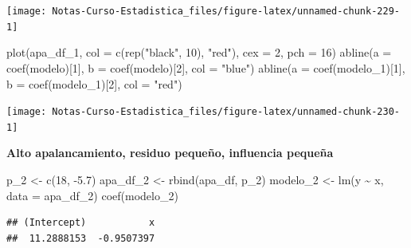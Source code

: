 \documentclass[
  12pt,
]{book}
\newenvironment{Shaded}{\begin{snugshade}}{\end{snugshade}}
\newcommand{\AttributeTok}[1]{\textcolor[rgb]{0.77,0.63,0.00}{#1}}
\newcommand{\DecValTok}[1]{\textcolor[rgb]{0.00,0.00,0.81}{#1}}
\newcommand{\FloatTok}[1]{\textcolor[rgb]{0.00,0.00,0.81}{#1}}
\newcommand{\FunctionTok}[1]{\textcolor[rgb]{0.00,0.00,0.00}{#1}}
\newcommand{\NormalTok}[1]{#1}
\newcommand{\OtherTok}[1]{\textcolor[rgb]{0.56,0.35,0.01}{#1}}
\newcommand{\SpecialCharTok}[1]{\textcolor[rgb]{0.00,0.00,0.00}{#1}}
\newcommand{\StringTok}[1]{\textcolor[rgb]{0.31,0.60,0.02}{#1}}
\theoremstyle{definition}
\theoremstyle{definition}
\theoremstyle{definition}
\theoremstyle{remark}
\begin{document}
\begin{center}\texttt{[image: Notas-Curso-Estadistica\_files/figure-latex/unnamed-chunk-229-1]} \end{center}

\begin{Shaded}
\begin{Highlighting}[]
\FunctionTok{plot}\NormalTok{(apa\_df\_1, }\AttributeTok{col =} \FunctionTok{c}\NormalTok{(}\FunctionTok{rep}\NormalTok{(}\StringTok{"black"}\NormalTok{, }\DecValTok{10}\NormalTok{), }\StringTok{"red"}\NormalTok{), }\AttributeTok{cex =} \DecValTok{2}\NormalTok{, }
    \AttributeTok{pch =} \DecValTok{16}\NormalTok{)}
\FunctionTok{abline}\NormalTok{(}\AttributeTok{a =} \FunctionTok{coef}\NormalTok{(modelo)[}\DecValTok{1}\NormalTok{], }\AttributeTok{b =} \FunctionTok{coef}\NormalTok{(modelo)[}\DecValTok{2}\NormalTok{], }\AttributeTok{col =} \StringTok{"blue"}\NormalTok{)}
\FunctionTok{abline}\NormalTok{(}\AttributeTok{a =} \FunctionTok{coef}\NormalTok{(modelo\_1)[}\DecValTok{1}\NormalTok{], }\AttributeTok{b =} \FunctionTok{coef}\NormalTok{(modelo\_1)[}\DecValTok{2}\NormalTok{], }
    \AttributeTok{col =} \StringTok{"red"}\NormalTok{)}
\end{Highlighting}
\end{Shaded}

\begin{center}\texttt{[image: Notas-Curso-Estadistica\_files/figure-latex/unnamed-chunk-230-1]} \end{center}

\textbf{Alto apalancamiento, residuo pequeño, influencia pequeña}

\begin{Shaded}
\begin{Highlighting}[]
\NormalTok{p\_2 }\OtherTok{\textless{}{-}} \FunctionTok{c}\NormalTok{(}\DecValTok{18}\NormalTok{, }\SpecialCharTok{{-}}\FloatTok{5.7}\NormalTok{)}
\NormalTok{apa\_df\_2 }\OtherTok{\textless{}{-}} \FunctionTok{rbind}\NormalTok{(apa\_df, p\_2)}
\NormalTok{modelo\_2 }\OtherTok{\textless{}{-}} \FunctionTok{lm}\NormalTok{(y }\SpecialCharTok{\textasciitilde{}}\NormalTok{ x, }\AttributeTok{data =}\NormalTok{ apa\_df\_2)}
\FunctionTok{coef}\NormalTok{(modelo\_2)}
\end{Highlighting}
\end{Shaded}

\begin{verbatim}
## (Intercept)           x 
##  11.2888153  -0.9507397
\end{verbatim}
\end{document}
